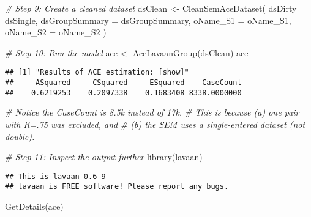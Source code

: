 \documentclass[smallextended]{svjour3}       %
\newenvironment{Shaded}{\begin{snugshade}}{\end{snugshade}}
\newcommand{\AttributeTok}[1]{\textcolor[rgb]{0.77,0.63,0.00}{#1}}
\newcommand{\CommentTok}[1]{\textcolor[rgb]{0.56,0.35,0.01}{\textit{#1}}}
\newcommand{\FunctionTok}[1]{\textcolor[rgb]{0.00,0.00,0.00}{#1}}
\newcommand{\NormalTok}[1]{#1}
\newcommand{\OtherTok}[1]{\textcolor[rgb]{0.56,0.35,0.01}{#1}}
\begin{document}
\begin{Shaded}
\begin{Highlighting}[]
\CommentTok{\# Step 9: Create a cleaned dataset}
\NormalTok{dsClean }\OtherTok{\textless{}{-}} 
  \FunctionTok{CleanSemAceDataset}\NormalTok{(}
    \AttributeTok{dsDirty         =}\NormalTok{ dsSingle, }
    \AttributeTok{dsGroupSummary  =}\NormalTok{ dsGroupSummary, }
    \AttributeTok{oName\_S1        =}\NormalTok{ oName\_S1, }
    \AttributeTok{oName\_S2        =}\NormalTok{ oName\_S2}
\NormalTok{  )}

\CommentTok{\# Step 10: Run the model}
\NormalTok{ace }\OtherTok{\textless{}{-}} \FunctionTok{AceLavaanGroup}\NormalTok{(dsClean)}
\NormalTok{ace}
\end{Highlighting}
\end{Shaded}

\begin{verbatim}
## [1] "Results of ACE estimation: [show]"
##     ASquared     CSquared     ESquared    CaseCount 
##    0.6219253    0.2097338    0.1683408 8338.0000000
\end{verbatim}

\begin{Shaded}
\begin{Highlighting}[]
\CommentTok{\# Notice the \textquotesingle{}CaseCount\textquotesingle{} is 8.5k instead of 17k.}
\CommentTok{\#   This is because (a) one pair with R=.75 was excluded, and}
\CommentTok{\#   (b) the SEM uses a single{-}entered dataset (not double).}

\CommentTok{\# Step 11: Inspect the output further}
\FunctionTok{library}\NormalTok{(lavaan)}
\end{Highlighting}
\end{Shaded}

\begin{verbatim}
## This is lavaan 0.6-9
## lavaan is FREE software! Please report any bugs.
\end{verbatim}

\begin{Shaded}
\begin{Highlighting}[]
\FunctionTok{GetDetails}\NormalTok{(ace)}
\end{Highlighting}
\end{Shaded}
\end{document}
